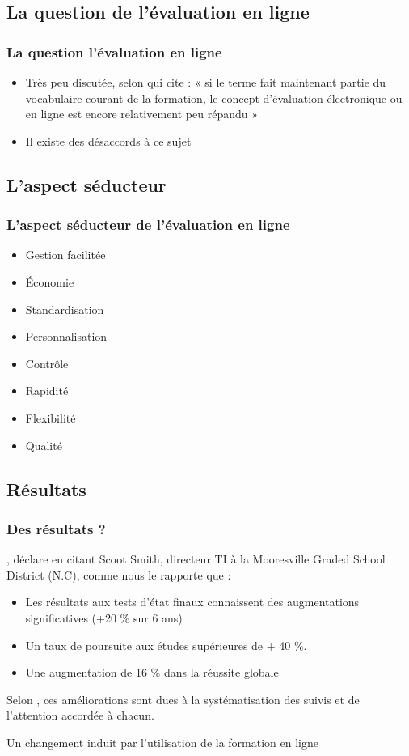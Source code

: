 \documentclass[aspectratio=169]{beamer}
\begin{document}
		\subsection{La question de l'évaluation en ligne} 
		\begin{frame}
			\frametitle{La question l'évaluation en ligne}
			\begin {itemize}
				\item Très peu discutée, selon \citet{audet2011a} qui cite \citet{buzzetto2006a} : « si le terme fait maintenant partie du vocabulaire courant de la formation, le concept d'évaluation électronique ou en ligne est encore relativement peu répandu »
				\item Il existe des désaccords à ce sujet
				
			\end{itemize}
		\end{frame}
		
	\subsection{L'aspect séducteur} 
		\begin{frame}
			\frametitle{L'aspect séducteur de l'évaluation en ligne\citep{Lamontagne2013}}
			\begin {itemize}
				\item Gestion facilitée
				\item Économie
				\item Standardisation
				\item Personnalisation
				\item Contrôle
				\item Rapidité
				\item Flexibilité
				\item Qualité
			\end{itemize}
		\end{frame}
	
	\subsection{Résultats} 
		\begin{frame}
			\frametitle{Des résultats ?}
			\citet {Stansbury2013C}, déclare en citant Scoot Smith, directeur TI à la Mooresville Graded School District (N.C), comme nous le rapporte \citet{Lamontagne2013} que :
			\begin {itemize}
				\item Les résultats aux tests d'état finaux connaissent des augmentations significatives (+20 \% sur 6 ans)
				\item Un taux de poursuite aux études supérieures de + 40 \%.
				\item Une augmentation de 16 \% dans la réussite globale
			\end{itemize}
			Selon \citet{Lamontagne2013}, ces améliorations sont dues à la systématisation des suivis et de l'attention accordée à chacun.
			\par \alert{Un changement induit par l'utilisation de la formation en ligne}
		\end{frame}
	
\end{document}
